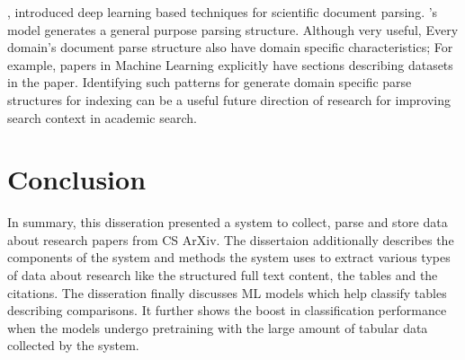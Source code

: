 \cite{kashyap2020sciwing}, introduced deep learning based techniques for scientific document parsing. \cite{kashyap2020sciwing}'s model generates a general purpose parsing structure. Although very useful, Every domain's document parse structure also have domain specific characteristics; For example, papers in Machine Learning explicitly have sections describing datasets in the paper. Identifying such patterns for generate domain specific parse structures for indexing can be a useful future direction of research for improving search context in academic search.

\section{Conclusion}
In summary, this disseration presented a system to collect, parse and store data about research papers from CS ArXiv. The dissertaion additionally describes the components of the system and methods the system uses to extract various types of data about research like the structured full text content, the tables and the citations. The disseration finally discusses ML models which help classify tables describing comparisons. It further shows the boost in classification performance when the models undergo pretraining with the large amount of tabular data collected by the system. 
